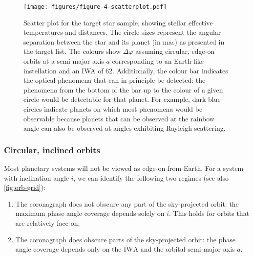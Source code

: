 \documentclass[
    usenatbib,
]{mnras}
\newcommand{\IWA}{\ensuremath{\mathrm{IWA}}}
\begin{document}
\begin{figure*}
    \centering
    \texttt{[image: figures/figure-4-scatterplot.pdf]}
    \caption{
        Scatter plot for the target star sample, showing stellar effective 
        temperatures and distances.
        The circle sizes represent the angular separation between 
        the star and its planet (in mas) as presented in the target list.
        The colours show $\Delta \varphi$ assuming circular, edge-on orbits
        at a semi-major axis $a$ corresponding to an Earth-like 
        instellation and an IWA of \qty{62}{\mas}.
        Additionally, the colour bar indicates the optical phenomena that 
        can in principle be detected: the phenomena from the bottom of the bar up to the colour of a given circle would be detectable for that planet.
        For example, dark blue circles indicate planets on which most phenomena would be observable because planets that can be observed at the rainbow angle can also be observed at angles exhibiting Rayleigh scattering.
    }
    \label{fig:scatterplot}
\end{figure*}


\subsubsection{Circular, inclined orbits}

Most planetary systems will not be viewed as edge-on from Earth.
%
For a system with inclination angle $i$, we can identify the following two regimes (see also \cref{fig:orb-grid}):
\begin{enumerate}
    \item The coronagraph does not obscure any part of the sky-projected orbit: 
    the maximum phase angle coverage depends solely on $i$. This 
    holds for orbits that are relatively face-on; 
    \item The coronagraph does obscure parts of the sky-projected orbit: 
    the phase angle coverage depends only on the \IWA{} and 
    the orbital semi-major axis $a$. 
\end{enumerate}
\end{document}
